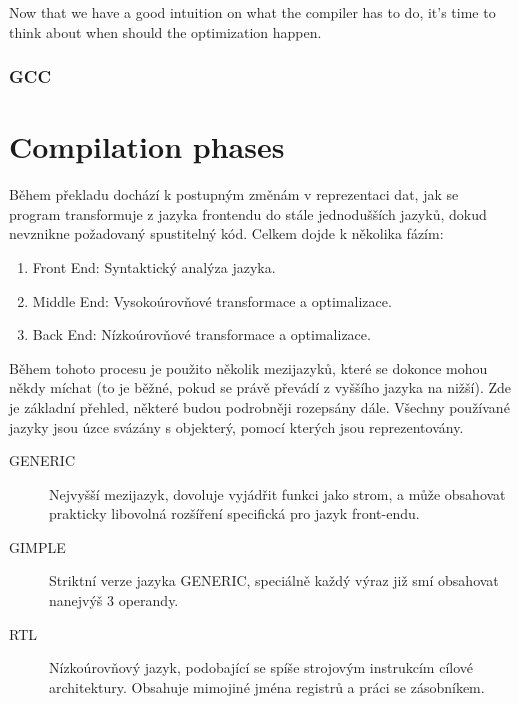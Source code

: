 Now that we have a good intuition on what the compiler has to do, it's time to
think about when should the optimization happen.





\subsubsection{GCC}




\section{Compilation phases}


Během překladu dochází k postupným změnám v reprezentaci dat, jak se program
transformuje z jazyka frontendu do stále jednodušších jazyků, dokud nevznikne
požadovaný spustitelný kód. Celkem dojde k několika fázím:

\begin{enumerate}
	\item Front End: Syntaktický analýza jazyka.
	\item Middle End: Vysokoúrovňové transformace a optimalizace.
	\item Back End: Nízkoúrovňové transformace a optimalizace.
\end{enumerate}

Během tohoto procesu je použito několik mezijazyků, které se dokonce mohou někdy
míchat (to je běžné, pokud se právě převádí z vyššího jazyka na nižší). Zde je
základní přehled, některé budou podrobněji rozepsány dále. Všechny používané
jazyky jsou úzce svázány s objekterý, pomocí kterých jsou reprezentovány.

\begin{description}
	\item[GENERIC] Nejvyšší mezijazyk, dovoluje vyjádřit funkci jako strom, a
		může obsahovat prakticky libovolná rozšíření specifická pro jazyk
		front-endu.
	\item[GIMPLE] Striktní verze jazyka GENERIC, speciálně každý výraz již smí
		obsahovat nanejvýš 3 operandy.
	\item[RTL] Nízkoúrovňový jazyk, podobající se spíše strojovým instrukcím
		cílové architektury. Obsahuje mimojiné jména registrů a práci se
		zásobníkem.
\end{description}


